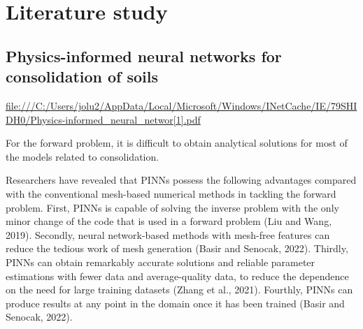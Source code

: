 


\chapter{Literature study}

\section{Physics-informed neural networks
  for consolidation of soils}

\url{file:///C:/Users/jolu2/AppData/Local/Microsoft/Windows/INetCache/IE/79SHIDH0/Physics-informed_neural_networ[1].pdf
}

For the forward problem, it is difficult to obtain analytical solutions for most of the
models related to consolidation.

Researchers have revealed that PINNs possess the following advantages compared with the conventional mesh-based numerical methods in tackling the forward problem. 
First, PINNs is capable of solving the inverse problem with the only minor change of the code that is used in a forward problem (Liu and Wang, 2019). Secondly, neural network-based methods with mesh-free features can reduce the tedious work of mesh generation (Basir and Senocak, 2022). 
Thirdly, PINNs can obtain remarkably accurate solutions and reliable parameter estimations with fewer data and average-quality data, to reduce the dependence on the need for large training datasets (Zhang et al., 2021). Fourthly, PINNs can produce results at any point in the domain once it has been trained (Basir and Senocak, 2022).
